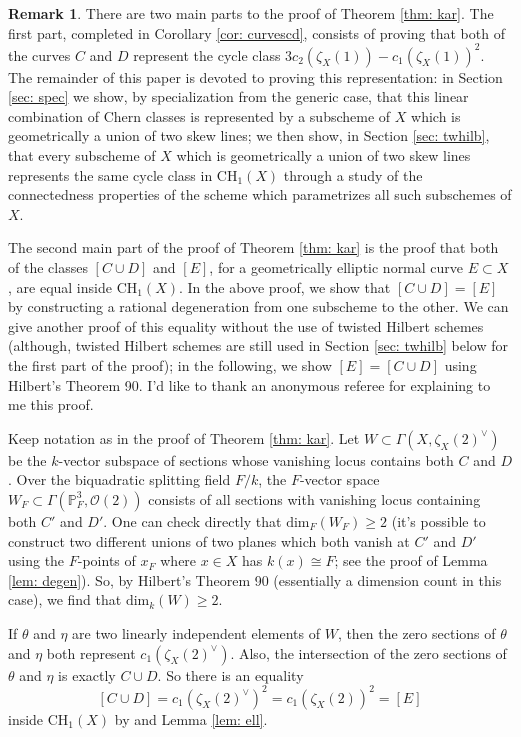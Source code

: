 \documentclass[12pt]{amsart}
\theoremstyle{definition}
\newtheorem{rmk}[thm]{Remark}
\newcommand{\CH}{\mathrm{CH}}
\begin{document}
\begin{rmk}\label{rmk: rmkref}
	There are two main parts to the proof of Theorem \ref{thm: kar}. The first part, completed in Corollary \ref{cor: curvescd}, consists of proving that both of the curves $C$ and $D$ represent the cycle class $3c_2(\zeta_X(1))-c_1(\zeta_X(1))^2$. The remainder of this paper is devoted to proving this representation: in Section \ref{sec: spec} we show, by specialization from the generic case, that this linear combination of Chern classes is represented by a subscheme of $X$ which is geometrically a union of two skew lines; we then show, in Section \ref{sec: twhilb}, that every subscheme of $X$ which is geometrically a union of two skew lines represents the same cycle class in $\CH_1(X)$ through a study of the connectedness properties of the scheme which parametrizes all such subschemes of $X$.
	
	The second main part of the proof of Theorem \ref{thm: kar} is the proof that both of the classes $[C\cup D]$ and $[E]$, for a geometrically elliptic normal curve $E\subset X$, are equal inside $\CH_1(X)$. In the above proof, we show that $[C\cup D]=[E]$ by constructing a rational degeneration from one subscheme to the other. We can give another proof of this equality without the use of twisted Hilbert schemes (although, twisted Hilbert schemes are still used in Section \ref{sec: twhilb} below for the first part of the proof); in the following, we show $[E]=[C\cup D]$ using Hilbert's Theorem 90. I'd like to thank an anonymous referee for explaining to me this proof.
	
	Keep notation as in the proof of Theorem \ref{thm: kar}. Let $W\subset \Gamma(X,\zeta_X(2)^\vee)$ be the $k$-vector subspace of sections whose vanishing locus contains both $C$ and $D$. Over the biquadratic splitting field $F/k$, the $F$-vector space $W_F\subset \Gamma(\mathbb{P}^3_F,\mathcal{O}(2))$ consists of all sections with vanishing locus containing both $C'$ and $D'$. One can check directly that $\mathrm{dim}_F(W_F)\geq 2$ (it's possible to construct two different unions of two planes which both vanish at $C'$ and $D'$ using the $F$-points of $x_F$ where $x\in X$ has $k(x)\cong F$; see the proof of Lemma \ref{lem: degen}). So, by Hilbert's Theorem  90 (essentially a dimension count in this case), we find that $\mathrm{dim}_k(W)\geq 2$.
	
	If $\theta$ and $\eta$ are two linearly independent elements of $W$, then the zero sections of $\theta$ and $\eta$ both represent $c_1(\zeta_X(2)^\vee)$. Also, the intersection of the zero sections of $\theta$ and $\eta$ is exactly $C\cup D$. So there is an equality \[[C\cup D]=c_1(\zeta_X(2)^\vee)^2=c_1(\zeta_X(2))^2=[E]\] inside $\CH_1(X)$ by \cite[\href{https://stacks.math.columbia.edu/tag/0B1I}{Tag 0B1I}]{stacks-project} and Lemma \ref{lem: ell}.
\end{rmk}
\end{document}
